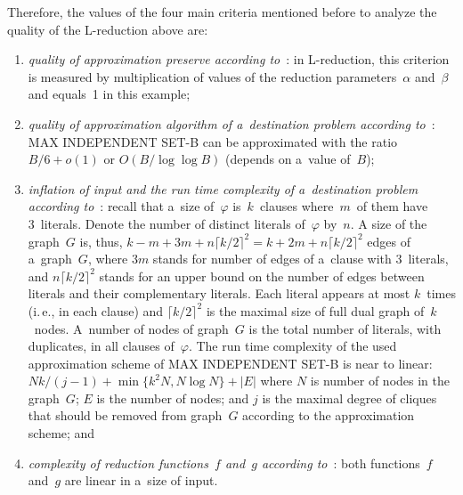 \begin{multicols}{2}
Therefore, the values of the four main criteria mentioned
before to analyze the quality of the L-reduction above are:\\[-13pt]
\begin{enumerate}[(1)]
\item {\it quality of approximation preserve according
to}~\cite{MSAT3Example, P1994}: in L-reduction, this criterion
is measured by multiplication of values of the reduction parameters~$\alpha$ and~$\beta$
and equals~1 in this
example;\\[-14pt]
\item {\it quality of approximation algorithm of a~destination
problem according to}~\cite{HR1994}: {MAX INDEPENDENT SET-B} can
be approximated with the ratio ${B}/{6}+o(1)$ or
$O({B}/{\log\log B})$ (depends on a~value of~$B$);\\[-14pt]
\item {\it inflation of input and the run time complexity of
a~destination problem according to}~\cite{MSAT3Example, P1994}:
recall that a~size of~$\varphi$ is~$k$~clauses where~$m$~of them
have 3~literals. Denote the number of distinct literals of~$\varphi$
by~$n$. A size of the graph~$G$ is, thus, $k - m + 3m + n{\lceil k/2
\rceil}^2 = k + 2m + n{\lceil k/2 \rceil}^2$ edges of a~graph~$G$,
where $3m$ stands for number of edges of a~clause with 3~literals,
and $n{\lceil k/2 \rceil}^2$ stands for an upper bound on the number
of edges between literals and their complementary literals. Each
literal appears at most $k$~times (i.\,e., in each clause) and
${\lceil k/2 \rceil}^2$ is the maximal size of full dual graph of~$k$~nodes. A~number of nodes
of graph~$G$ is the total number of
literals, with duplicates, in all clauses of~$\varphi$. The run time
complexity of the used approximation scheme of {MAX INDEPENDENT
SET-B} is near to linear: $N{k}/({j-1})+\min\{k^2N,N\log
N\}+|E|$ where $N$ is number of nodes in the graph~$G$; $E$ is the
number of nodes;  and $j$ is the maximal degree of cliques that should be
removed from graph~$G$ according to the approximation scheme; and
\item {\it complexity of reduction functions~$f$ and~$g$
according to}~\cite{MSAT3Example, P1994}: both functions~$f$
and~$g$ are
linear in a~size of input.
\end{enumerate}

\begin{table*}\small %
\begin{center}
\label{tab:LReductionsCompare}
\vspace*{2ex}


\end{center}
\end{table*}
\end{multicols}
